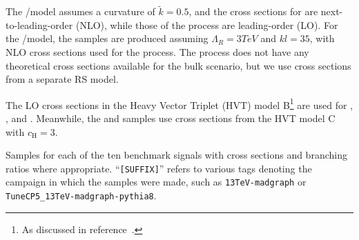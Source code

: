 The \ggF/\VBF\GBulktoWW model assumes a curvature of $\tilde{k}=0.5$, and the cross sections for \ggF\GBulktoWW are next-to-leading-order (NLO), while those of the \VBF process are leading-order (LO).
For the \ggF/\VBF\RadtoWW model, the samples are produced assuming $\Lambda_{R}=3\unit{TeV}$ and $kl=35$, with NLO cross sections used for the \ggF process.
The \VBF process does not have any theoretical cross sections available for the bulk scenario, but we use cross sections from a separate RS model.

The LO cross sections in the Heavy Vector Triplet (HVT) model B\footnote{As discussed in reference~\cite{Pappadopulo_2014}.} are used for \DY\ZprtoWW, \DY\WprtoWZ, and \DY\WprtoWH.%
Meanwhile, the \VBF\ZprtoWW and \DY\WprtoWZ samples use cross sections from the HVT model C with $c_\mathrm{H}=3$.%

\begin{table}[htbp]
  \centering
  
  \caption{
    Samples for each of the ten benchmark signals with cross sections and branching ratios where appropriate.
    ``\texttt{[SUFFIX]}'' refers to various tags denoting the campaign in which the samples were made, such as \texttt{13TeV-madgraph} or \texttt{TuneCP5\_13TeV-madgraph-pythia8}.
  }
  \label{tab:sigSamples}
\end{table}

